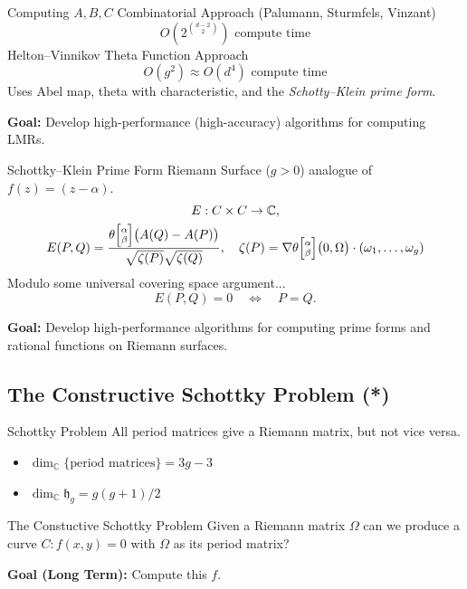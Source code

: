 \documentclass{beamer}
\DeclareMathOperator{\CC}{\mathbb{C}}
\newcommand{\thetachar}[2] {\theta {\scriptsize \begin{bmatrix}#1\\#2\end{bmatrix}}}
\begin{document}
\begin{frame}{Computing $A,B,C$}{}
  Combinatorial Approach (Palumann, Sturmfels, Vinzant)
  \[
      O \left( 2^{d-2 \choose 2} \right)
      \text{ compute time}
  \]
  Helton--Vinnikov Theta Function Approach
  \[
      O \left( g^2 \right) \approx O \left( d^4 \right)
      \text{ compute time}
  \]
  Uses Abel map, theta with characteristic, and the {\it Schotty--Klein
    prime form}. \\

  \vspace{16pt}

  {\bf Goal:} Develop high-performance (high-accuracy) algorithms for
  computing LMRs.
\end{frame}


\begin{frame}{Schottky--Klein Prime Form}{}
  Riemann Surface ($g>0$) analogue of $f(z) = (z-\alpha)$.
  \begin{gather*}
      E : C \times C \to \mathbb{C}, \\
      E(P,Q) = \frac{
        \thetachar{\alpha}{\beta}
        \big(
        A(Q) - A(P)
        \big)
        }
      {
        \sqrt{\zeta(P)} \sqrt{\zeta(Q)}
      },
      \quad \zeta(P) = \nabla \thetachar{\alpha}{\beta}
      \big( 0, \Omega \big) \cdot (\omega_1, \ldots, \omega_g)
  \end{gather*}
  Modulo some universal covering space argument...
  \[
      E(P,Q) = 0 \quad \Leftrightarrow \quad P=Q.
  \]

  {\bf Goal:} Develop high-performance algorithms for computing prime
  forms and rational functions on Riemann surfaces.
\end{frame}


\subsection{The Constructive Schottky Problem (*)}



\begin{frame}{Schottky Problem}{}
  All period matrices give a Riemann matrix, but not vice versa.
  \begin{itemize}
    \item $\dim_{\CC} \{ \text{period matrices} \} = 3g-3$
    \item $\dim_{\CC} \mathfrak{h}_g = g(g+1)/2$
  \end{itemize}

  \vspace{16pt}

  \begin{block}{The Constuctive Schottky Problem}
    Given a Riemann matrix $\Omega$ can we produce a curve $C : f(x,y) =
    0$ with $\Omega$ as its period matrix?
  \end{block}

  \vspace{16pt}

  {\bf Goal (Long Term):} Compute this $f$.
\end{frame}
\end{document}
